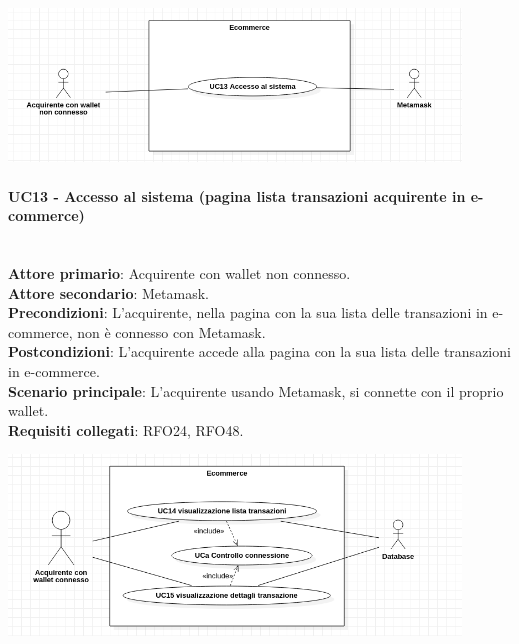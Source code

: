 \documentclass[a4paper, 12pt]{article}
\begin{document}
\includegraphics[width=0.9\textwidth]{UC_ECA1}

\paragraph{UC13 - Accesso al sistema (pagina lista transazioni acquirente in e-commerce)}\\
\textbf{Attore primario}: Acquirente con wallet non connesso.\\
\textbf{Attore secondario}: Metamask.\\
\textbf{Precondizioni}: L'acquirente, nella pagina con la sua lista delle transazioni in e-commerce, non è connesso con Metamask.\\
\textbf{Postcondizioni}: L'acquirente accede alla pagina con la sua lista delle transazioni in e-commerce.\\
\textbf{Scenario principale}:
L'acquirente usando Metamask, si connette con il proprio wallet.\\
\textbf{Requisiti collegati}: RFO24, RFO48.

\includegraphics[width=0.9\textwidth]{UC_ECA2}
\end{document}
